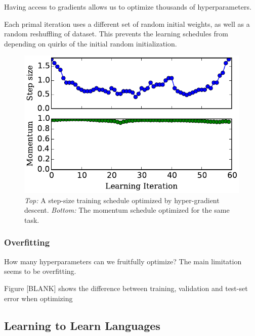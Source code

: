 \documentclass{article}
\begin{document}
Having access to gradients allows us to optimize thousands of hyperparameters.

Each primal iteration uses a different set of random initial weights, as well as a random reshuffling of dataset.
This prevents the learning schedules from depending on quirks of the initial random initialization.

\begin{figure}[ht]
\vskip 0.2in
\begin{center}
\centerline{\includegraphics[width=\columnwidth]{../experiments/Jan_26_schedule_curves/6_large_weights_II/alpha_beta_paper.pdf}}
\caption{\emph{Top:} A step-size training schedule optimized by hyper-gradient descent.
\emph{Bottom:} The momentum schedule optimized for the same task.}
\label{fig:optimal schedule}
\end{center}
\vskip -0.2in
\end{figure} 

\subsubsection{Overfitting}

How many hyperparameters can we fruitfully optimize?
The main limitation seems to be overfitting.

Figure [BLANK] shows the difference between training, validation and test-set error when optimizing 


\subsection{Learning to Learn Languages}
\end{document}
